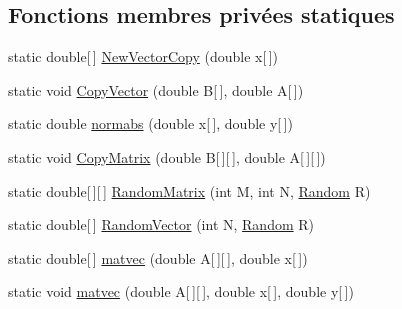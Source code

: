 \subsection*{Fonctions membres privées statiques}
\begin{DoxyCompactItemize}
\item 
static double\mbox{[}$\,$\mbox{]} \hyperlink{classjnt_1_1scimark2_1_1kernel_a9c739150a417f3f623bc8eb5e22ce16b}{New\-Vector\-Copy} (double x\mbox{[}$\,$\mbox{]})
\item 
static void \hyperlink{classjnt_1_1scimark2_1_1kernel_ad06bbc7f9897a7d78a49539231901397}{Copy\-Vector} (double B\mbox{[}$\,$\mbox{]}, double A\mbox{[}$\,$\mbox{]})
\item 
static double \hyperlink{classjnt_1_1scimark2_1_1kernel_a1edeb02de8714924bf125bbf31f18f17}{normabs} (double x\mbox{[}$\,$\mbox{]}, double y\mbox{[}$\,$\mbox{]})
\item 
static void \hyperlink{classjnt_1_1scimark2_1_1kernel_a1836102aaf083dc0977161622fb96603}{Copy\-Matrix} (double B\mbox{[}$\,$\mbox{]}\mbox{[}$\,$\mbox{]}, double A\mbox{[}$\,$\mbox{]}\mbox{[}$\,$\mbox{]})
\item 
static double\mbox{[}$\,$\mbox{]}\mbox{[}$\,$\mbox{]} \hyperlink{classjnt_1_1scimark2_1_1kernel_a5dd3e8306f6b1797ac9d333260138ccf}{Random\-Matrix} (int M, int N, \hyperlink{classjnt_1_1scimark2_1_1Random}{Random} R)
\item 
static double\mbox{[}$\,$\mbox{]} \hyperlink{classjnt_1_1scimark2_1_1kernel_ab137b3f2ae634cd8df2ecbd453dff779}{Random\-Vector} (int N, \hyperlink{classjnt_1_1scimark2_1_1Random}{Random} R)
\item 
static double\mbox{[}$\,$\mbox{]} \hyperlink{classjnt_1_1scimark2_1_1kernel_ab976c8c7c156771124378ddc1f0f07c3}{matvec} (double A\mbox{[}$\,$\mbox{]}\mbox{[}$\,$\mbox{]}, double x\mbox{[}$\,$\mbox{]})
\item 
static void \hyperlink{classjnt_1_1scimark2_1_1kernel_a697a7e59eed672b06dde6e6361f9b909}{matvec} (double A\mbox{[}$\,$\mbox{]}\mbox{[}$\,$\mbox{]}, double x\mbox{[}$\,$\mbox{]}, double y\mbox{[}$\,$\mbox{]})
\end{DoxyCompactItemize}


